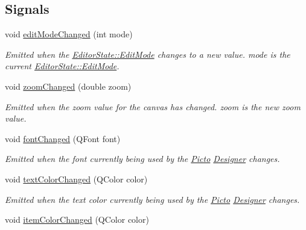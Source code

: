 \subsection*{Signals}
\begin{DoxyCompactItemize}
\item 
\hypertarget{class_editor_state_ac654abb4fb812ab6c010eb91ca25ecf2}{void \hyperlink{class_editor_state_ac654abb4fb812ab6c010eb91ca25ecf2}{edit\-Mode\-Changed} (int mode)}\label{class_editor_state_ac654abb4fb812ab6c010eb91ca25ecf2}

\begin{DoxyCompactList}\small\item\em Emitted when the \hyperlink{class_editor_state_a30123e595784b2228edc2a0c2b46ab28}{Editor\-State\-::\-Edit\-Mode} changes to a new value. mode is the current \hyperlink{class_editor_state_a30123e595784b2228edc2a0c2b46ab28}{Editor\-State\-::\-Edit\-Mode}. \end{DoxyCompactList}\item 
void \hyperlink{class_editor_state_af5b7818287993dcab74199b4f71593e3}{zoom\-Changed} (double zoom)
\begin{DoxyCompactList}\small\item\em Emitted when the zoom value for the canvas has changed. zoom is the new zoom value. \end{DoxyCompactList}\item 
void \hyperlink{class_editor_state_ae76679fb6a87c2feead88d25b56af323}{font\-Changed} (Q\-Font font)
\begin{DoxyCompactList}\small\item\em Emitted when the font currently being used by the \hyperlink{namespace_picto}{Picto} \hyperlink{class_designer}{Designer} changes. \end{DoxyCompactList}\item 
void \hyperlink{class_editor_state_a6c7d2c3d7cbc553a674e4fb2ad1011c3}{text\-Color\-Changed} (Q\-Color color)
\begin{DoxyCompactList}\small\item\em Emitted when the text color currently being used by the \hyperlink{namespace_picto}{Picto} \hyperlink{class_designer}{Designer} changes. \end{DoxyCompactList}\item 
\hypertarget{class_editor_state_a127386630f919ed5a3bfbbc259d3b30c}{void \hyperlink{class_editor_state_a127386630f919ed5a3bfbbc259d3b30c}{item\-Color\-Changed} (Q\-Color color)}\label{class_editor_state_a127386630f919ed5a3bfbbc259d3b30c}


\end{DoxyCompactItemize}
